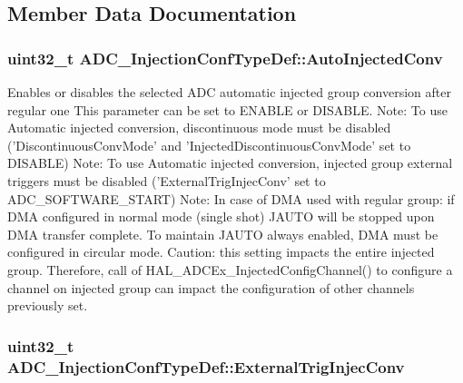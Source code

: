 \subsection{Member Data Documentation}
\hypertarget{struct_a_d_c___injection_conf_type_def_ab0e74342214a5610e6b4f1f080f10544}{
\subsubsection[{Auto\-Injected\-Conv}]{\setlength{\rightskip}{0pt plus 5cm}uint32\-\_\-t A\-D\-C\-\_\-\-Injection\-Conf\-Type\-Def\-::\-Auto\-Injected\-Conv}}\label{struct_a_d_c___injection_conf_type_def_ab0e74342214a5610e6b4f1f080f10544}
Enables or disables the selected A\-D\-C automatic injected group conversion after regular one This parameter can be set to E\-N\-A\-B\-L\-E or D\-I\-S\-A\-B\-L\-E. Note\-: To use Automatic injected conversion, discontinuous mode must be disabled ('Discontinuous\-Conv\-Mode' and 'Injected\-Discontinuous\-Conv\-Mode' set to D\-I\-S\-A\-B\-L\-E) Note\-: To use Automatic injected conversion, injected group external triggers must be disabled ('External\-Trig\-Injec\-Conv' set to A\-D\-C\-\_\-\-S\-O\-F\-T\-W\-A\-R\-E\-\_\-\-S\-T\-A\-R\-T) Note\-: In case of D\-M\-A used with regular group\-: if D\-M\-A configured in normal mode (single shot) J\-A\-U\-T\-O will be stopped upon D\-M\-A transfer complete. To maintain J\-A\-U\-T\-O always enabled, D\-M\-A must be configured in circular mode. Caution\-: this setting impacts the entire injected group. Therefore, call of H\-A\-L\-\_\-\-A\-D\-C\-Ex\-\_\-\-Injected\-Config\-Channel() to configure a channel on injected group can impact the configuration of other channels previously set. \hypertarget{struct_a_d_c___injection_conf_type_def_ac3431d4d3e3089f0db271bfb06dbffc0}{
\subsubsection[{External\-Trig\-Injec\-Conv}]{\setlength{\rightskip}{0pt plus 5cm}uint32\-\_\-t A\-D\-C\-\_\-\-Injection\-Conf\-Type\-Def\-::\-External\-Trig\-Injec\-Conv}}\label{struct_a_d_c___injection_conf_type_def_ac3431d4d3e3089f0db271bfb06dbffc0}

